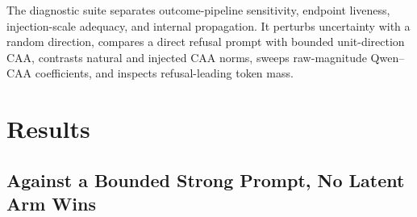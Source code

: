 \documentclass[manuscript,review,anonymous]{acmart}
\begin{document}
The diagnostic suite separates outcome-pipeline sensitivity, endpoint liveness, injection-scale adequacy, and internal propagation. It perturbs uncertainty with a random direction, compares a direct refusal prompt with bounded unit-direction CAA, contrasts natural and injected CAA norms, sweeps raw-magnitude Qwen--CAA coefficients, and inspects refusal-leading token mass. {}%
{}%
{}%



\section{Results}\label{results}

\subsection{Against a Bounded Strong Prompt, No Latent Arm Wins}\label{against-the-experts-ceiling-no-latent-arm-wins}
\end{document}
